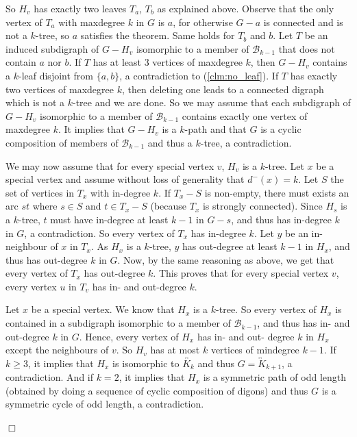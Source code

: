 \documentclass[11pt]{article}
\newcommand{\mc}{\mathcal}
\newcommand{\olra}{\overleftrightarrow}
\newcounter{claim}
\newenvironment{proof}[1][]%
 {\noindent {\setcounter{claim}{0}\sc proof ---
   }{#1}{}}{\hfill$\Box$\vspace{2ex}}
\begin{document}
\begin{proof}
So $H_v$ has exactly two leaves $T_a$, $T_b$ as explained above. 
Observe that the only vertex of $T_a$ with maxdegree $k$ in $G$ is $a$, for otherwise $G-a$ is connected and is not a $k$-tree, so $a$ satisfies the theorem. 
Same holds for $T_b$ and $b$. 
Let $T$ be an induced subdigraph of $G-H_v$ isomorphic to a member of $\mathcal B_{k-1}$ that does not contain $a$ nor $b$. 
If $T$ has at least $3$ vertices of maxdegree $k$, then $G-H_v$ contains a $k$-leaf disjoint from $\{a,b\}$, a contradiction to (\ref{clm:no_leaf}). 
If $T$ has exactly two vertices of maxdegree $k$, then deleting one leads to a connected digraph which is not a $k$-tree and we are done. 
So we may assume that each subdigraph of $G-H_v$ isomorphic to a member of $\mathcal B_{k-1}$ contains exactly one vertex of maxdegree $k$. 
It implies that $G-H_v$ is a $k$-path and that $G$ is a cyclic composition of members of $\mathcal B_{k-1}$ and thus a $k$-tree, a contradiction. 
\medskip

We may now assume that for every special vertex $v$, $H_v$ is a $k$-tree. 
Let $x$ be a special vertex and assume without loss of generality that $d^-(x) = k$. 
Let $S$ the set of vertices in $T_x$ with in-degree $k$. 
If $T_x -S$ is non-empty, there must exists an arc $st$ where $s \in S$ and $t \in T_x - S$ (because $T_x$ is strongly connected).  
Since $H_s$ is a $k$-tree, $t$ must have in-degree at least $k-1$ in $G-s$, and thus has in-degree $k$ in $G$, a contradiction. So every vertex of $T_x$ has in-degree $k$. 
Let $y$ be an in-neighbour of $x$ in $T_x$. 
As $H_x$ is a $k$-tree, $y$ has out-degree at least $k-1$ in $H_x$, and thus has out-degree $k$ in $G$. Now, by the same reasoning as above, we get that every vertex of $T_x$ has out-degree $k$. 
This proves that for every special vertex $v$, every vertex $u$ in $T_v$ has in- and out-degree $k$.  

Let $x$ be a special vertex. We know that $H_x$ is a $k$-tree. So every vertex of $H_x$ is contained in a subdigraph isomorphic to a member of $\mc B_{k-1}$, and thus has in- and out-degree $k$ in $G$. 
Hence, every vertex of $H_x$ has in- and out- degree $k$ in $H_x$ except the neighbours of $v$. So $H_v$ has at most $k$ vertices of mindegree $k-1$. 
If $k \geq 3$, it implies that $H_x$ is isomorphic to $\olra{K_k}$ and thus $G = \olra K_{k+1}$, a contradiction. And if $k=2$, it implies that $H_x$ is a symmetric path of odd length (obtained by doing a sequence of cyclic composition of digons) and thus $G$ is a symmetric cycle of odd length, a contradiction. 





\end{proof}
\end{document}
